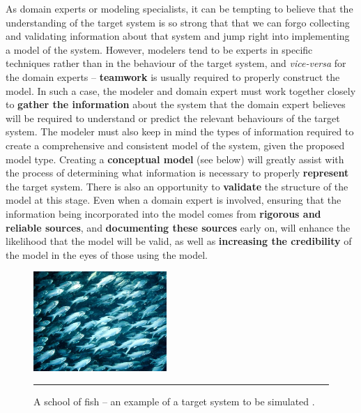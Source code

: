 As domain experts or modeling specialists, it can be tempting to believe that the understanding of the target system is so strong that that we can forgo collecting and validating information about that system and jump right into implementing a model of the system. However,  modelers tend to be experts in specific techniques rather than in the behaviour of the target system, and \textit{vice-versa} for the domain experts -- \textbf{teamwork} is usually required  to properly construct the model.
\newpage\noindent
In such a case, the modeler and domain expert must work together closely to \textbf{gather the information} about the system that the domain expert believes will be required to understand or predict the relevant behaviours of the target system. The modeler must also keep in mind the types of information required to create a comprehensive and consistent model of the system, given the proposed model type. Creating a \textbf{conceptual model} (see below) will greatly assist with the process of determining what information is necessary to properly \textbf{represent} the target system.
\newl There is also an opportunity to \textbf{validate} the structure of the model at this stage. Even when a domain expert is involved, ensuring that the information being incorporated into the model comes from \textbf{rigorous and reliable sources}, and \textbf{documenting these sources} early on, will enhance the likelihood that the model will be valid, as well as \textbf{increasing the credibility} of the model in the eyes of those using the model.
\begin{figure}[!t]
	\centering
		\includegraphics[width=0.45\textwidth]{images/SIM/Sixfinger_threadfin_school.jpg}
	\caption[\small A school of fish -- the target system for a fish school simulation]{\small A school of fish -- an example of a target system to be simulated \cite{SIM_FISH}.} 
	\label{simfig:4}\hrule
\end{figure}
\afterpage{\FloatBarrier}

